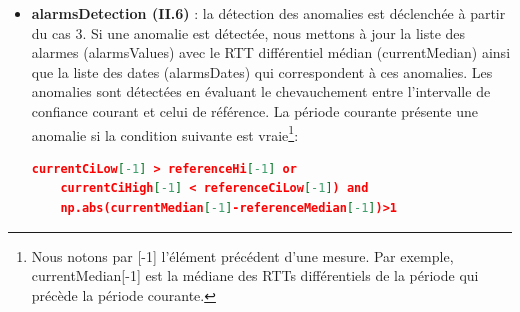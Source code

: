 \begin{itemize}
\begin{enumerate}
\begin{itemize}
			\item  Soit \textit{aggr\_median} la médiane de tous les RTTs différentiels médians de référence calculés pour toutes les périodes précédentes. 
			
			\item 	Soit \textit{aggr\_ciLow} la médiane de     toutes les bornes inférieures calculées pendant les périodes précédentes.
			
			\item 	Soit \textit{aggr\_ciHigh} la médiane de     toutes les bornes inférieures calculées pendant les périodes précédentes.
			
		\end{itemize}
		
		
		\item \underline{Cas $3$} : une fois la référence est assez représentable, nous mettons à jour cette dernière comme suit \footnote{Nous précisons que $ var[-1] $ dénote la dernière valeur que $ var $  avait. }:
\begin{align*}
referenceMedian &=  0.99*referenceMedian[-1]+0.01*currentMedian\\
referenceCiLow &=	 0.99*referenceLow[-1]+0.01*rttDiffL\\
referenceCiHight &=  0.99*referenceHight[-1]+0.01*rttDiffH
\end{align*}
		
		
Pour toute période, la mise à jour de la référence est effectuée selon un des trois cas. Nous précision que $ \alpha = 0.01 $.
		
	\end{enumerate}
	\item \textbf{ alarmsDetection (II.6) }:   la détection des anomalies est déclenchée à partir du cas $3$. Si une anomalie est détectée, nous mettons à jour la liste des alarmes  {\color{gray}(alarmsValues)} avec le RTT différentiel médian (currentMedian) ainsi que la
	liste des dates  {\color{gray}(alarmsDates)} qui correspondent à ces anomalies. Les anomalies sont détectées en évaluant le chevauchement entre l'intervalle de confiance courant et celui de référence. La période courante présente une anomalie si la condition suivante est vraie\footnote{Nous notons par [-1] l'élément précédent d'une mesure. Par exemple, currentMedian[-1] est la médiane des RTTs différentiels de la période qui précède la période courante.}:
	\begin{lstlisting}[language=json,firstnumber=1, caption={Conditions de présence d'une anomalie pour un lien},
	basicstyle =\footnotesize]
	currentCiLow[-1] > referenceHi[-1] or
	currentCiHigh[-1] < referenceCiLow[-1]) and
	np.abs(currentMedian[-1]-referenceMedian[-1])>1
	\end{lstlisting}
	
	
	
\end{itemize}

